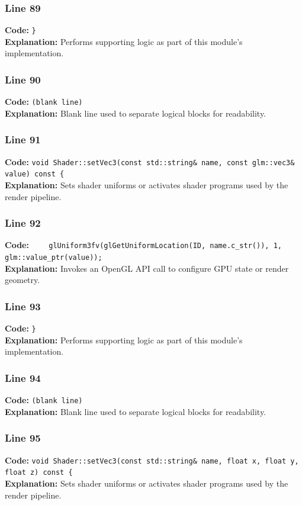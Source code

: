 \documentclass[11pt,a4paper]{article}
\begin{document}
\subsubsection*{Line 89}
\textbf{Code:} \verb|}|\\
\textbf{Explanation:} Performs supporting logic as part of this module's implementation.

\subsubsection*{Line 90}
\textbf{Code:} \texttt{(blank line)}\\
\textbf{Explanation:} Blank line used to separate logical blocks for readability.

\subsubsection*{Line 91}
\textbf{Code:} \verb|void Shader::setVec3(const std::string& name, const glm::vec3& value) const {|\\
\textbf{Explanation:} Sets shader uniforms or activates shader programs used by the render pipeline.

\subsubsection*{Line 92}
\textbf{Code:} \verb|    glUniform3fv(glGetUniformLocation(ID, name.c_str()), 1, glm::value_ptr(value));|\\
\textbf{Explanation:} Invokes an OpenGL API call to configure GPU state or render geometry.

\subsubsection*{Line 93}
\textbf{Code:} \verb|}|\\
\textbf{Explanation:} Performs supporting logic as part of this module's implementation.

\subsubsection*{Line 94}
\textbf{Code:} \texttt{(blank line)}\\
\textbf{Explanation:} Blank line used to separate logical blocks for readability.

\subsubsection*{Line 95}
\textbf{Code:} \verb|void Shader::setVec3(const std::string& name, float x, float y, float z) const {|\\
\textbf{Explanation:} Sets shader uniforms or activates shader programs used by the render pipeline.
\end{document}
